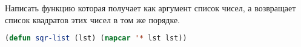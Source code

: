 Написать функцию которая получает как аргумент список чисел, а возвращает список
квадратов этих чисел в том же порядке.

\begin{lstlisting}[language=Lisp]
(defun sqr-list (lst) (mapcar '* lst lst))
\end{lstlisting}


